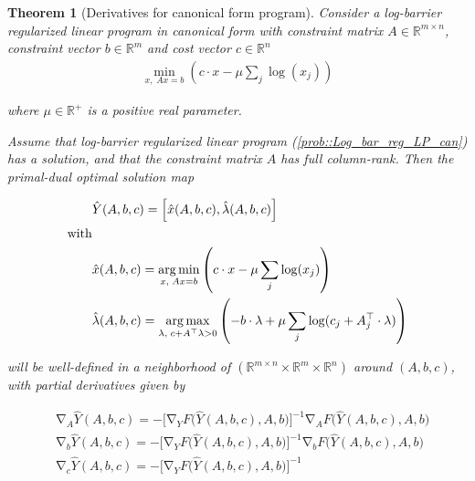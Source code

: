 \documentclass[12pt]{article}
\newcommand{\R}{\mathbb{R}}
\DeclareMathOperator{\grad}{\mathop{\nabla}}
\DeclareMathOperator*{\argmin}{arg\,min}
\DeclareMathOperator*{\argmax}{arg\,max}
\newcommand{\dotprod}[2]{#1\mathbin{\cdot}#2}
\newcommand{\pa}[1]{\left( #1 \right)}
\newcommand{\bpa}[1]{\big( #1 \big)}
\newcommand{\br}[1]{\left[ #1 \right]}
\newcommand{\bbr}[1]{\big[ #1 \big]}
\newtheorem{theorem}{Theorem}
\begin{document}
\begin{theorem}[Derivatives for canonical form program]
Consider a log-barrier regularized linear program in canonical form with constraint matrix $A \in \R^{m \times n}$, 
constraint vector $b \in \R^{m}$ and cost vector $c \in \R^{n}$ 
\begin{align}
    \label{prob::Log_bar_reg_LP_can}
    \min_{ x , \; Ax = b } \pa{\dotprod{c}{x} - \mu \sum_j \log(x_j)} 
\end{align}

where $\mu \in \R^+$ is a positive real parameter.

Assume that log-barrier regularized linear program (\ref{prob::Log_bar_reg_LP_can}) has a solution, 
and that the constraint matrix $A$ has full column-rank. Then the primal-dual optimal solution map

\newcommand{\dualopt}{\hat{{\lambda}}(A,b,c)}
\newcommand{\primaldualopt}{\hat Y(A,b,c)}

\begin{subequations}
    \label{eq::optimal_solution_maps_can}
\begin{align}
    \label{eq::optimal_solution_map_primal_dual}
    &\primaldualopt = \br{\xopt, \dualopt} \\
    \text{with} \nonumber \\
    \label{eq::optimal_solution_map_primal}
    &\xopt = \argmin_{ x , \; Ax = b } \pa{\dotprod{c}{x} - \mu \sum_j \log(x_j)} \\
    \label{eq::optimal_solution_map_dual}
    &\dualopt = \argmax_{ \lambda , \; c + A^\top \lambda \mathbin{>} 0 } \pa{-\dotprod{b}{\lambda} + \mu \sum_j \log(c_j + \dotprod{A^{\top}_j}{\lambda})} 
\end{align}
\end{subequations}

will be well-defined in a neighborhood of $(\R^{m\times n} \times \R^{m} \times \R^{n} )$ around  $(A, b, c)$,
with partial derivatives given by

\begin{subequations}
\label{eq::Main_result}


\begin{align}
    \label{eq::can_constraint_matrix_derivative}
    & \grad_A \primaldualopt = - \bbr{\grad_{Y}F\bpa{\primaldualopt, A, b}}^{-1}\grad_{A}F\bpa{\primaldualopt, A, b} \\
    \label{eq::can_constraint_vector_derivative}
    & \grad_b \primaldualopt = - \bbr{\grad_{Y}F\bpa{\primaldualopt, A, b}}^{-1}\grad_{b}F\bpa{\primaldualopt, A, b} \\
    \label{eq::can_cost_vector_derivative}
    & \grad_c \primaldualopt = - \bbr{\grad_{Y}F\bpa{\primaldualopt, A, b}}^{-1}
\end{align}
\end{subequations}


\end{theorem}
\end{document}
